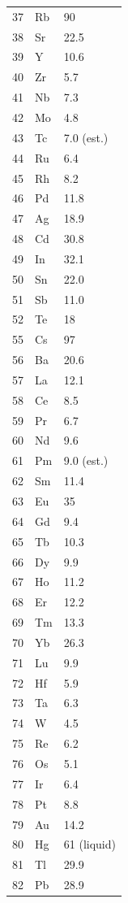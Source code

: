 \documentclass[12pt,a4paper]{article}
\begin{document}
\begin{longtable}{p{0.6cm}p{1.2cm}p{1.5cm}}
		37 & Rb & 90 \\
		38 & Sr & 22.5 \\
		39 & Y  & 10.6 \\
		40 & Zr & 5.7 \\
		41 & Nb & 7.3 \\
		42 & Mo & 4.8 \\
		43 & Tc & 7.0 (est.) \\
		44 & Ru & 6.4 \\
		45 & Rh & 8.2 \\
		46 & Pd & 11.8 \\
		47 & Ag & 18.9 \\
		48 & Cd & 30.8 \\
		49 & In & 32.1 \\
		50 & Sn & 22.0 \\
		51 & Sb & 11.0 \\
		52 & Te & 18 \\
		55 & Cs & 97 \\
		56 & Ba & 20.6 \\
		57 & La & 12.1 \\
		58 & Ce & 8.5 \\
		59 & Pr & 6.7 \\
		60 & Nd & 9.6 \\
		61 & Pm & 9.0 (est.) \\
		62 & Sm & 11.4 \\
		63 & Eu & 35 \\
		64 & Gd & 9.4 \\
		65 & Tb & 10.3 \\
		66 & Dy & 9.9 \\
		67 & Ho & 11.2 \\
		68 & Er & 12.2 \\
		69 & Tm & 13.3 \\
		70 & Yb & 26.3 \\
		71 & Lu & 9.9 \\
		72 & Hf & 5.9 \\
		73 & Ta & 6.3 \\
		74 & W  & 4.5 \\
		75 & Re & 6.2 \\
		76 & Os & 5.1 \\
		77 & Ir & 6.4 \\
		78 & Pt & 8.8 \\
		79 & Au & 14.2 \\
		80 & Hg & 61 (liquid) \\
		81 & Tl & 29.9 \\
		82 & Pb & 28.9 \\
	\end{longtable}
	
\end{document}
